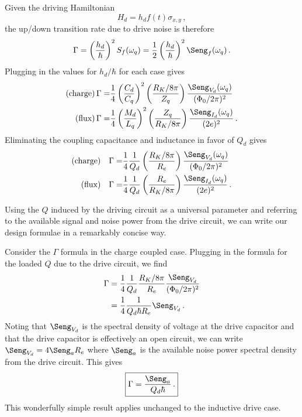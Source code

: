 Given the driving Hamiltonian
\begin{displaymath}
  H_d = h_d f(t) \sigma_{x,y} \, ,
\end{displaymath}
the up/down transition rate due to drive noise is therefore
\begin{equation*}
  \Gamma = \left( \frac{h_d}{\hbar} \right)^2 S_f(\omega_q) = \frac{1}{2} \left( \frac{h_d}{\hbar} \right)^2 \Seng_f(\omega_q) \, .
\end{equation*}
Plugging in the values for $h_d/\hbar$ for each case gives
\begin{align*}
  \text{(charge)} \, \Gamma =&
    \frac{1}{4} \left( \frac{C_d}{C_q} \right)^2
    \left( \frac{R_K/8\pi}{Z_q} \right) \frac{\Seng_{V_d}(\omega_q)}{(\Phi_0/2\pi)^2} \\
  \text{(flux)} \, \Gamma =&
    \frac{1}{4} \left( \frac{M_d}{L_q} \right)^2
    \left( \frac{Z_q}{R_K/8\pi} \right) \frac{\Seng_{I_d}(\omega_q)}{(2e)^2} \, .
\end{align*}
Eliminating the coupling capacitance and inductance in favor of $Q_d$ gives
\begin{align}
  \text{(charge)} \quad \Gamma
  =& \frac{1}{4} \frac{1}{Q_d}
  \left( \frac{R_K/8\pi}{R_e}\right) \frac{\Seng_{V_d}(\omega_q)}{(\Phi_0/2\pi)^2} \\
  \text{(flux)} \quad \Gamma
  =& \frac{1}{4} \frac{1}{Q_d} \left( \frac{R_e}{R_K/8\pi} \right) \frac{\Seng_{I_d}(\omega_q)}{(2e)^2} \, .
\end{align}


Using the $Q$ induced by the driving circuit as a universal parameter and referring to the available signal and noise power from the drive circuit, we can write our design formulae in a remarkably concise way.

Consider the $\Gamma$ formula in the charge coupled case.
Plugging in the formula for the loaded $Q$ due to the drive circuit, we find
\begin{align*}
  \Gamma
  & = \frac{1}{4} \frac{1}{Q_d} \frac{R_K / 8\pi}{R_e} \frac{\Seng_{V_d}}{(\Phi_0 / 2\pi)^2} \\
  & = \frac{1}{4} \frac{1}{Q_d \hbar R_e} \Seng_{V_d} \, .
\end{align*}
Noting that $\Seng_{V_d}$ is the spectral density of voltage at the drive capacitor and that the drive capacitor is effectively an open circuit, we can write $\Seng_{V_d} = 4 \Seng_a R_e$ where $\Seng_a$ is the available noise power spectral density from the drive circuit.
This gives
\begin{equation}
  \boxed{\Gamma = \frac{\Seng_a}{Q_d \hbar} \, .}
\end{equation}
This wonderfully simple result applies unchanged to the inductive drive case.

